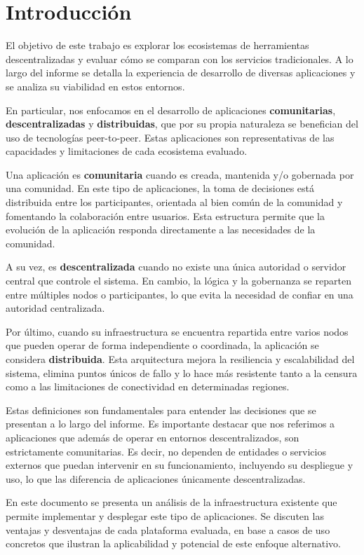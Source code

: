 \section{Introducción}

El objetivo de este trabajo es explorar los ecosistemas de herramientas descentralizadas y evaluar cómo se comparan con los servicios tradicionales. A lo largo del informe se detalla la experiencia de desarrollo de diversas aplicaciones y se analiza su viabilidad en estos entornos.

En particular, nos enfocamos en el desarrollo de aplicaciones \textbf{comunitarias}, \textbf{descentralizadas} y \textbf{distribuidas}, que por su propia naturaleza se benefician del uso de tecnologías peer-to-peer. Estas aplicaciones son representativas de las capacidades y limitaciones de cada ecosistema evaluado.

Una aplicación es \textbf{comunitaria} cuando es creada, mantenida y/o gobernada por una comunidad. En este tipo de aplicaciones, la toma de decisiones está distribuida entre los participantes, orientada al bien común de la comunidad y fomentando la colaboración entre usuarios. Esta estructura permite que la evolución de la aplicación responda directamente a las necesidades de la comunidad.

A su vez, es \textbf{descentralizada} cuando no existe una única autoridad o servidor central que controle el sistema. En cambio, la lógica y la gobernanza se reparten entre múltiples nodos o participantes, lo que evita la necesidad de confiar en una autoridad centralizada.

Por último, cuando su infraestructura se encuentra repartida entre varios nodos que pueden operar de forma independiente o coordinada, la aplicación se considera \textbf{distribuida}. Esta arquitectura mejora la resiliencia y escalabilidad del sistema, elimina puntos únicos de fallo y lo hace más resistente tanto a la censura como a las limitaciones de conectividad en determinadas regiones.

Estas definiciones son fundamentales para entender las decisiones que se presentan a lo largo del informe. Es importante destacar que nos referimos a aplicaciones que además de operar en entornos descentralizados, son estrictamente comunitarias. Es decir, no dependen de entidades o servicios externos que puedan intervenir en su funcionamiento, incluyendo su despliegue y uso, lo que las diferencia de aplicaciones únicamente descentralizadas.

En este documento se presenta un análisis de la infraestructura existente que permite implementar y desplegar este tipo de aplicaciones. Se discuten las ventajas y desventajas de cada plataforma evaluada, en base a casos de uso concretos que ilustran la aplicabilidad y potencial de este enfoque alternativo.


